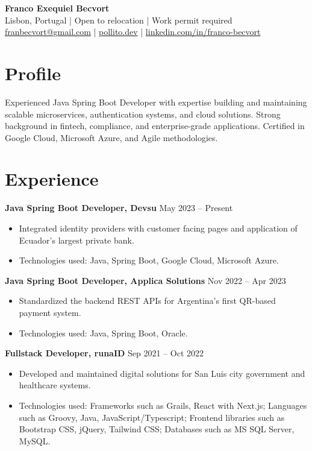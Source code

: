 \documentclass[10pt, letterpaper]{article}
\begin{document}
\begin{center}
    {\LARGE\bfseries Franco Exequiel Becvort} \\
    Lisbon, Portugal | Open to relocation | Work permit required \\
    \href{mailto:franbecvort@gmail.com}{franbecvort@gmail.com} | 
    \href{https://pollito.dev/}{pollito.dev} | 
    \href{https://linkedin.com/in/franco-becvort}{linkedin.com/in/franco-becvort} \\
\end{center}

\vspace{5pt}

\section{Profile}
Experienced Java Spring Boot Developer with expertise building and maintaining scalable microservices, authentication systems, and cloud solutions. Strong background in fintech, compliance, and enterprise-grade applications. Certified in Google Cloud, Microsoft Azure, and Agile methodologies.

\section{Experience}
\textbf{Java Spring Boot Developer, Devsu} \hfill May 2023 – Present \
\begin{itemize}[leftmargin=10pt, noitemsep]
    \item Integrated identity providers with customer facing pages and application of Ecuador’s largest private bank.
    \item Technologies used: Java, Spring Boot, Google Cloud, Microsoft Azure.
\end{itemize}

\textbf{Java Spring Boot Developer, Applica Solutions} \hfill Nov 2022 – Apr 2023 \
\begin{itemize}[leftmargin=10pt, noitemsep]
    \item Standardized the backend REST APIs for Argentina’s first QR-based payment system.
    \item Technologies used: Java, Spring Boot, Oracle.
\end{itemize}

\textbf{Fullstack Developer, runaID} \hfill Sep 2021 – Oct 2022 \
\begin{itemize}[leftmargin=10pt, noitemsep]
    \item Developed and maintained digital solutions for San Luis city government and healthcare systems.
    \item Technologies used: Frameworks such as Grails, React with Next.js; Languages such as Groovy, Java, JavaScript/Typescript; Frontend libraries such as Bootstrap CSS, jQuery, Tailwind CSS; Databases such as MS SQL Server, MySQL.
\end{itemize}
\end{document}
